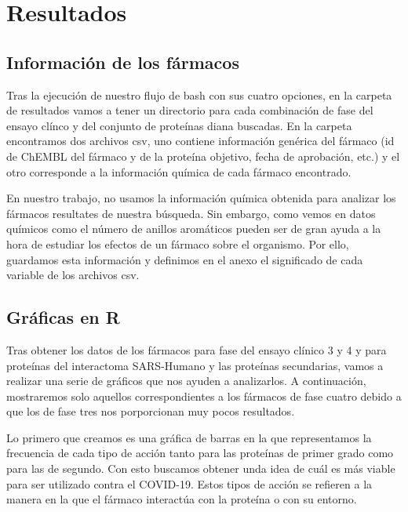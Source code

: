 \section{Resultados}
\subsection{Información de los fármacos}

Tras la ejecución de nuestro flujo de bash con sus cuatro opciones, en la carpeta de resultados vamos a tener un directorio para cada combinación de fase del ensayo clínco y del conjunto de proteínas diana buscadas. En la carpeta encontramos dos archivos csv, uno contiene información genérica del fármaco (id de ChEMBL del fármaco y de la proteína objetivo, fecha de aprobación, etc.) y el otro corresponde a la información química de cada fármaco encontrado. 

En nuestro trabajo, no usamos la información química obtenida para analizar los fármacos resultates de nuestra búsqueda. Sin embargo, como vemos en \cite{Poleto2018} datos químicos como el número de anillos aromáticos pueden ser de gran ayuda a la hora de estudiar los efectos de un fármaco sobre el organismo. Por ello, guardamos esta información y definimos en el anexo el significado de cada variable de los archivos csv.


\subsection{Gráficas en R}
Tras obtener los datos de los fármacos para fase del ensayo clínico 3 y 4 y para proteínas del interactoma SARS-Humano y las proteínas secundarias, vamos a realizar una serie de gráficos que nos ayuden a analizarlos. A continuación, mostraremos solo aquellos correspondientes a los fármacos de fase cuatro debido a que los de fase tres nos porporcionan muy pocos resultados. 

Lo primero que creamos es una gráfica de barras en la que representamos la frecuencia de cada tipo de acción tanto para las proteínas de primer grado como para las de segundo. Con esto buscamos obtener unda idea de cuál es más viable para ser utilizado contra el COVID-19. Estos tipos de acción se refieren a la manera en la que el fármaco interactúa con la proteína o con su entorno.

